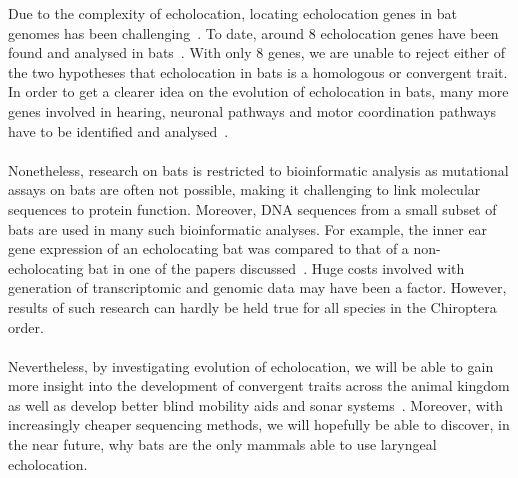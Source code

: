 \documentclass[11pt]{article}
\begin{document}
Due to the complexity of echolocation, locating echolocation genes in bat genomes has been challenging~\citep{Teeling2009}. To date, around 8 echolocation genes have been found and analysed in bats~\citep{Li2007, Zou2015}. With only 8 genes, we are unable to reject either of the two hypotheses that echolocation in bats is a homologous or convergent trait. In order to get a clearer idea on the evolution of echolocation in bats, many more genes involved in hearing, neuronal pathways and motor coordination pathways have to be identified and analysed~\citep{Li2008a}. 
\\
\\
Nonetheless, research on bats is restricted to bioinformatic analysis as mutational assays on bats are often not possible, making it challenging to link molecular sequences to protein function. Moreover, DNA sequences from a small subset of bats are used in many such bioinformatic analyses. For example, the inner ear gene expression of an echolocating bat was compared to that of a non-echolocating bat in one of the papers discussed~\citep{Eick2005}. Huge costs involved with generation of transcriptomic and genomic data may have been a factor. However, results of such research can hardly be held true for all species in the Chiroptera order.
\\
\\
Nevertheless, by investigating evolution of echolocation, we will be able to gain more insight into the development of convergent traits across the animal kingdom as well as develop better blind mobility aids and sonar systems~\citep{Ifukube1991}. Moreover, with increasingly cheaper sequencing methods, we will hopefully be able to discover, in the near future, why bats are the only mammals able to use laryngeal echolocation.

\newpage


\end{document}
